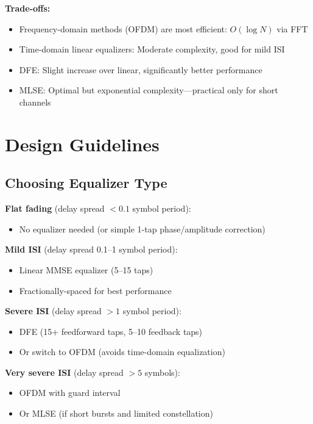 \textbf{Trade-offs:}
\begin{itemize}
\item Frequency-domain methods (OFDM) are most efficient: $O(\log N)$ via FFT
\item Time-domain linear equalizers: Moderate complexity, good for mild ISI
\item DFE: Slight increase over linear, significantly better performance
\item MLSE: Optimal but exponential complexity---practical only for short channels
\end{itemize}

\section{Design Guidelines}
\label{sec:design-guidelines}

\subsection{Choosing Equalizer Type}

\textbf{Flat fading} (delay spread $< 0.1$ symbol period):
\begin{itemize}
\item No equalizer needed (or simple 1-tap phase/amplitude correction)
\end{itemize}

\textbf{Mild ISI} (delay spread 0.1--1 symbol period):
\begin{itemize}
\item Linear MMSE equalizer (5--15 taps)
\item Fractionally-spaced for best performance
\end{itemize}

\textbf{Severe ISI} (delay spread $> 1$ symbol period):
\begin{itemize}
\item DFE (15+ feedforward taps, 5--10 feedback taps)
\item Or switch to OFDM (avoids time-domain equalization)
\end{itemize}

\textbf{Very severe ISI} (delay spread $> 5$ symbols):
\begin{itemize}
\item OFDM with guard interval
\item Or MLSE (if short bursts and limited constellation)
\end{itemize}

